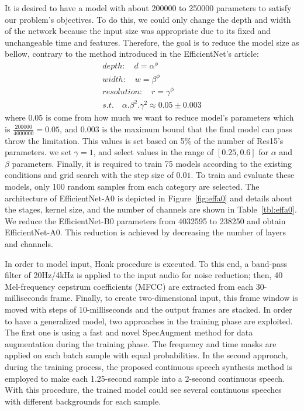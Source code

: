 \documentclass{article}
\begin{document}
It is desired to have a model with about 200000 to 250000 parameters to satisfy our problem's objectives. To do this, we could only change the depth and width of the network because the input size was appropriate due to its fixed and unchangeable time and features. Therefore, the goal is to reduce the model size as bellow, contrary to the method introduced in the EfficientNet's article:
\begin{equation}
\begin{split}
depth:\quad d = \alpha^\phi\\
width:\quad w = \beta^\phi\\
resolution:\quad r = \gamma^\phi \\
s.t.\quad\alpha.\beta^2.\gamma^2 \approx 0.05\pm 0.003
\end{split}
\end{equation}
where 0.05 is come from how much we want to reduce model's parameters which is $\frac{200000}{4000000} = 0.05$, and $0.003$ is the maximum bound that the final model can pass throw the limitation. This values is set based on 5\% of the number of Res15's parameters. we set $\gamma=1$, and select values in the range of $[0.25, 0.6]$ for $\alpha$ and $\beta$ parameters. Finally, it is required to train 75 models according to the existing conditions and grid search with the step size of $0.01$. To train and evaluate these models, only 100 random samples from each category are selected.
The architecture of EfficientNet-A0 is depicted in Figure~\ref{fig:effa0} and details about the stages, kernel size, and the number of channels are shown in Table~\ref{tbl:effa0}. We reduce the EfficientNet-B0 parameters from 4032595 to 238250 and obtain EfficientNet-A0. This reduction is achieved by decreasing the number of layers and channels.


In order to model input, Honk \cite{cnnsmall} procedure is executed. To this end, a band-pass filter of 20Hz/4kHz is applied to the input audio for noise reduction; then, 40 Mel-frequency cepstrum coefficients (MFCC) are extracted from each 30-milliseconds frame. Finally, to create two-dimensional input, this frame window is moved with steps of 10-milliseconds and the output frames are stacked. In order to have a generalized model, two approaches in the training phase are exploited. The first one is using a fast and novel SpecAugment method \cite{specaug} for data augmentation during the training phase. The frequency and time masks are applied on each batch sample with equal probabilities. In the second approach, during the training process, the proposed continuous speech synthesis method is employed to make each 1.25-second sample into a 2-second continuous speech. With this procedure, the trained model could see several continuous speeches with different backgrounds for each sample.
\end{document}
